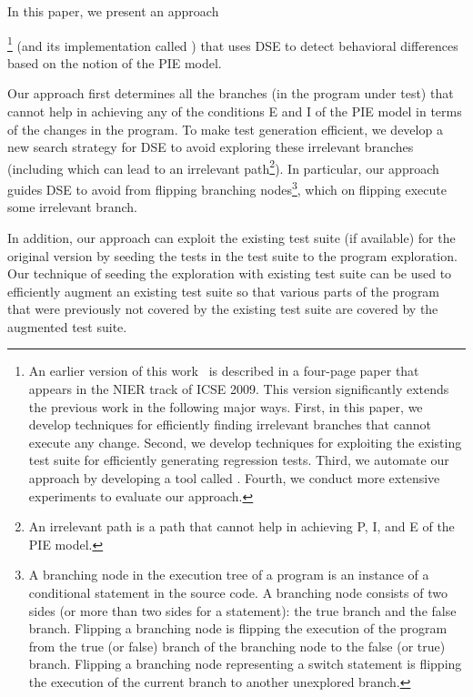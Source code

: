 In this paper, we present an approach{\footnote{\scriptsize{An earlier version of this work~\cite{taneja09:guided} is described in a four-page paper that appears in the NIER track of ICSE 2009. This
version significantly extends the previous work in the following major ways.
First, in this paper, we develop techniques for efficiently finding irrelevant branches 
that cannot execute any change. 
Second, we develop techniques for exploiting the existing test suite for efficiently generating regression tests.
Third, we automate our approach by developing a tool called . 
Fourth, we conduct more extensive experiments to evaluate our approach.}} (and its implementation called ) that uses DSE to detect behavioral differences based on the notion of the PIE model.

Our approach first determines all the branches (in the program under test) that cannot help in achieving any of the conditions E and I of the PIE model in terms of the changes in the program. To make test generation efficient, we develop a new search strategy for DSE to avoid exploring these irrelevant branches (including which can lead to an irrelevant path\footnote{\scriptsize{An irrelevant path is a path that cannot help in achieving P, I, and E of the PIE model.}}). In particular, our approach guides DSE to avoid from flipping branching nodes\footnote{\scriptsize{A branching node in the execution tree of a program is an instance of a conditional statement in the source code. A branching node consists of two sides (or more than two sides for a  statement): the true branch and the false branch. Flipping a branching node is flipping the execution of the program from the true (or false) branch of the branching node to the false (or true) branch. Flipping a branching node representing a switch statement is flipping the execution of the current branch to another unexplored branch.}}, which on flipping execute some irrelevant branch. 

In addition, our approach can exploit the existing test suite (if available) for the original version by seeding the tests in the test suite to the program exploration. Our technique of seeding the exploration with existing test suite can be used to efficiently augment an existing test suite so that various parts of the program that were previously not covered by the existing test suite are covered by the augmented test suite. 


}

